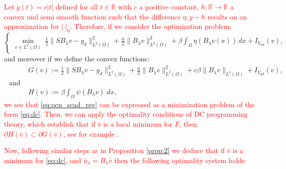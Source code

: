 \documentclass[11pt,a4paper]{amsart}
\renewcommand{\l}{\left}
\renewcommand{\r}{\right}
\newcommand{\om}{\Omega}
\newcommand{\reals}{\mathbb{R}}
\newcommand{\norm}[1]{\lVert #1 \rVert}
\begin{document}
\textcolor{red}{Let $g(t)=c|t|$ defined for all $t\in \reals$ with $c$ a positive constant, $h:\reals\to \reals$ a convex and semi smooth function such that the difference $\eta:g-h$ results on an approximation for $|\cdot|_0$. Therefore, if we consider the optimization problem:} 
\begin{equation}\label{eq:ocp_scad_reg}
    \begin{cases}
    \displaystyle\min_{v\in L^2(\om)} \; \frac{1}{2}\norm{SB_{\lambda}v-y_d}^2_{L^2(\om)}+ \frac{\alpha}{2} \|B_\lambda v\|^2_{L^2(\om)} + \beta\int_{\om} \eta\l(B_\lambda v(x)\r)\,dx + I_{V_{ad}}(v),
       \end{cases}
\end{equation}
and moreover if we define the convex functions:
\begin{subequations}
    \begin{align}
	&G(v):=\frac{1}{2}\norm{S	B_{\lambda}v-y_d}_{L^2(\om)}^2+\frac{\alpha}{2}\norm{	B_{\lambda}v}_{L^2(\om)}^2+c\beta\norm{B_{\lambda}v}_{L^1(\om)}+I_{V_{ad}}(v), \label{convexI}\\
 \mbox{ and }\nonumber\\
 &H(v):=\beta \int_{\om}\psi\l(B_{\lambda}v\r) \; dx,\label{convexII}
\end{align}
\end{subequations}
\textcolor{red}{we see that \eqref{eq:ocp_scad_reg} can be expressed as a minimization problem of the form \eqref{eq:dc}. Then, we can apply the optimality conditions of DC programming theory, which establish that if $\bar v$ is a local minimum for $F$, then $\partial H(\bar v)\subset \partial G(\bar v)$, see for example \cite{dchilbertspace}.} 

\textcolor{red}{Now, following similar steps as in Proposition \ref{prop:2} we deduce that if $\bar v$ is a minimum for \eqref{eq:dc}, and $\bar u_{\lambda}=B_{\lambda}\bar v$ then the following optimality system holds:}
\end{document}
